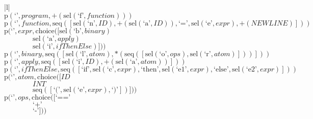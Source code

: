 \footnotesize\begin{center}\begin{tabular}{|l|}\hline
{}
\\\hline
$\mathrm{p}(\text{`'},\mathit{program},{+}\left(\mathrm{sel}\left(\text{`f'},\mathit{function}\right)\right))$	\\
$\mathrm{p}(\text{`'},\mathit{function},\mathrm{seq}\left(\left[\mathrm{sel}\left(\text{`n'},\mathit{ID}\right), {+}\left(\mathrm{sel}\left(\text{`a'},\mathit{ID}\right)\right), \text{`='}, \mathrm{sel}\left(\text{`e'},\mathit{expr}\right), {+}\left(\mathit{NEWLINE}\right)\right]\right))$	\\
$\mathrm{p}(\text{`'},\mathit{expr},\mathrm{choice}([\mathrm{sel}\left(\text{`b'},\mathit{binary}\right)$\\$\qquad\qquad\mathrm{sel}\left(\text{`a'},\mathit{apply}\right)$\\$\qquad\qquad\mathrm{sel}\left(\text{`i'},\mathit{ifThenElse}\right)]))$	\\
$\mathrm{p}(\text{`'},\mathit{binary},\mathrm{seq}\left(\left[\mathrm{sel}\left(\text{`l'},\mathit{atom}\right), {*}\left(\mathrm{seq}\left(\left[\mathrm{sel}\left(\text{`o'},\mathit{ops}\right), \mathrm{sel}\left(\text{`r'},\mathit{atom}\right)\right]\right)\right)\right]\right))$	\\
$\mathrm{p}(\text{`'},\mathit{apply},\mathrm{seq}\left(\left[\mathrm{sel}\left(\text{`i'},\mathit{ID}\right), {+}\left(\mathrm{sel}\left(\text{`a'},\mathit{atom}\right)\right)\right]\right))$	\\
$\mathrm{p}(\text{`'},\mathit{ifThenElse},\mathrm{seq}\left(\left[\text{`if'}, \mathrm{sel}\left(\text{`c'},\mathit{expr}\right), \text{`then'}, \mathrm{sel}\left(\text{`e1'},\mathit{expr}\right), \text{`else'}, \mathrm{sel}\left(\text{`e2'},\mathit{expr}\right)\right]\right))$	\\
$\mathrm{p}(\text{`'},\mathit{atom},\mathrm{choice}([\mathit{ID}$\\$\qquad\qquad\mathit{INT}$\\$\qquad\qquad\mathrm{seq}\left(\left[\text{`('}, \mathrm{sel}\left(\text{`e'},\mathit{expr}\right), \text{`)'}\right]\right)]))$	\\
$\mathrm{p}(\text{`'},\mathit{ops},\mathrm{choice}([\text{`=='}$\\$\qquad\qquad\text{`+'}$\\$\qquad\qquad\text{`-'}]))$	\\
\hline\end{tabular}\end{center}

